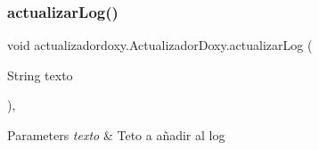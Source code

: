 \subsubsection{\texorpdfstring{actualizar\+Log()}{actualizarLog()}}
{\footnotesize\ttfamily void actualizadordoxy.\+Actualizador\+Doxy.\+actualizar\+Log (\begin{DoxyParamCaption}\item[{String}]{texto }\end{DoxyParamCaption})\hspace{0.3cm}{\ttfamily [inline]}, {\ttfamily [private]}}


\begin{DoxyParams}{Parameters}
{\em texto} & Teto a añadir al log \\
\hline
\end{DoxyParams}

